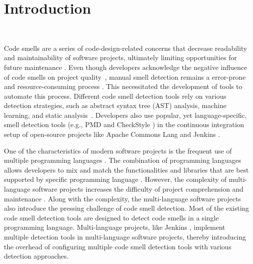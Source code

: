 \section{Introduction}~\label{sec:introduction}


Code smells are a series of code-design-related concerns that decrease
readability \cite{5741260,SANTOS2018450} and maintainability
\cite{6392174,6405287} of software projects, ultimately limiting opportunities
for future maintenance \cite{Fowler_Beck}. Even though developers acknowledge
the negative influence of code smells on project quality~\cite{developersCare},
manual smell detection remains a error-prone and resource-consuming process
\cite{DetectingDefectsInObject}. This necessitated the development of tools to
automate this process. Different code smell detection tools rely on various
detection strategies, such as abstract syntax tree (AST) analysis, machine
learning, and static analysis~\cite{ML}. Developers also use popular, yet
language-specific, smell detection tools (e.g., PMD \cite{PMD} and CheckStyle
\cite{CheckStyle}) in the continuous integration setup of open-source projects
like Apache Commons Lang \cite{ApacheCommonsLang} and Jenkins \cite{Jekins}.


One of the characteristics of modern software projects is the frequent use of
multiple programming languages \cite{723183}. The combination of programming
languages allows developers to mix and match the functionalities and libraries
that are best supported by specific programming language \cite{7476675}.
However, the complexity of multi-language software projects increases the
difficulty of project comprehension and maintenance \cite{7476675,
10.1109/SCAM.2012.11, 7396422}. Along with the complexity, the multi-language
software projects also introduce the pressing challenge of code smell
detection. Most of the existing code smell detection tools are designed to
detect code smells in a single programming language. Multi-language projects,
like Jenkins \cite{Jekins}, implement multiple detection tools in
multi-language software projects, thereby introducing the overhead of
configuring multiple code smell detection tools with various detection
approaches.

